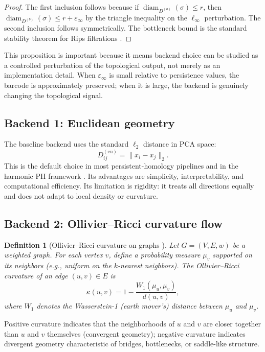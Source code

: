 \documentclass[11pt]{article}
\newtheorem{definition}[theorem]{Definition}
\DeclareMathOperator{\diam}{diam}
\begin{document}
\begin{proof}
The first inclusion follows because if $\diam_{D^{(a)}}(\sigma) \le r$, then $\diam_{D^{(b)}}(\sigma) \le r + \varepsilon_\infty$ by the triangle inequality on the $\ell_\infty$ perturbation.
The second inclusion follows symmetrically.
The bottleneck bound is the standard stability theorem for Rips filtrations \cite{chazal2014persistence}.
\end{proof}

This proposition is important because it means backend choice can be studied as a controlled perturbation of the topological output, not merely as an implementation detail.
When $\varepsilon_\infty$ is small relative to persistence values, the barcode is approximately preserved; when it is large, the backend is genuinely changing the topological signal.

\subsection{Backend 1: Euclidean geometry}

The baseline backend uses the standard $\ell_2$ distance in PCA space:
\[
D^{(\text{eu})}_{ij} = \|x_i - x_j\|_2.
\]
This is the default choice in most persistent-homology pipelines and in the harmonic PH framework \cite{harmonicPH}.
Its advantages are simplicity, interpretability, and computational efficiency.
Its limitation is rigidity: it treats all directions equally and does not adapt to local density or curvature.

\subsection{Backend 2: Ollivier--Ricci curvature flow}
\label{sec:ricci}

\begin{definition}[Ollivier--Ricci curvature on graphs \cite{ollivier2007,ollivier2009}]
Let $G = (V, E, w)$ be a weighted graph.
For each vertex $v$, define a probability measure $\mu_v$ supported on its neighbors (e.g., uniform on the $k$-nearest neighbors).
The \emph{Ollivier--Ricci curvature} of an edge $(u,v) \in E$ is
\[
\kappa(u,v) = 1 - \frac{W_1(\mu_u, \mu_v)}{d(u,v)},
\]
where $W_1$ denotes the Wasserstein-1 (earth mover's) distance between $\mu_u$ and $\mu_v$.
\end{definition}

Positive curvature indicates that the neighborhoods of $u$ and $v$ are closer together than $u$ and $v$ themselves (convergent geometry); negative curvature indicates divergent geometry characteristic of bridges, bottlenecks, or saddle-like structure.
\end{document}
